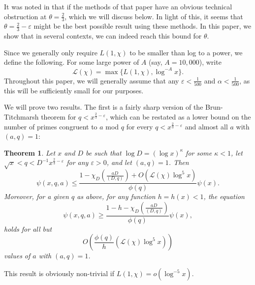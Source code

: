 \documentclass{amsart}
\newtheorem{theorem}{Theorem}[section]
\begin{document}
It was noted in \cite{FI03} that if the methods of that paper have an obvious technical obstruction at $\theta=\frac 23$, which we will discuss below.  In light of this, it seems that $\theta=\frac 23-\varepsilon$ might be the best possible result using these methods.  In this paper, we show that in several contexts, we can indeed reach this bound for $\theta$.

Since we generally only require $L(1,\chi)$ to be smaller than log to a power, we define the following.  For some large power of $A$ (say, $A=10,000$), write
$$\mathcal L(\chi)=\max\{L(1,\chi),\log^{-A}x\}.$$
Throughout this paper, we will generally assume that any $\varepsilon<\frac{1}{500}$ and $\alpha<\frac{1}{500}$, as this will be sufficiently small for our purposes.



We will prove two results.  The first is a fairly sharp version of the Brun-Titchmarsh theorem for $q<x^{\frac 23-\varepsilon}$, which can be restated as a lower bound on the number of primes congruent to $a$ mod $q$ for every $q<x^{\frac 23-\varepsilon}$ and almost all $a$ with $(a,q)=1$:




\begin{theorem}\label{Main1}
Let $x$ and $D$ be such that $\log D=(\log x)^{\kappa}$ for some $\kappa<1$, let $\sqrt x<q<D^{-1}x^{\frac 23-\varepsilon}$ for any $\varepsilon>0$, and let $(a,q)=1$.
Then
$$\psi(x,q,a)\leq \frac{1-\chi_D\left(\frac{aD}{(D,q)}\right)+O\left(\mathcal L(\chi)\log^5 x\right)}{\phi(q)}\psi(x).$$
Moreover, for a given $q$ as above, for any function $h=h(x)<1$, the equation
$$\psi(x,q,a)\geq \frac{1-h-\chi_D\left(\frac{aD}{(D,q)}\right)}{\phi(q)}\psi(x),$$
holds for all but $$O\left(\frac{\phi(q)}{h}\left(\mathcal L(\chi)\log^5 x\right)\right)$$values of $a$ with $(a,q)=1$.
\end{theorem}
This result is obviously non-trivial if $L(1,\chi)=o\left(\log^{-5} x\right)$.
\end{document}

